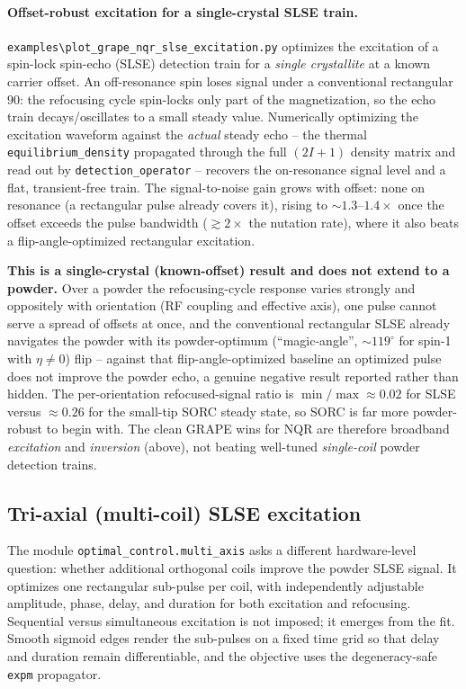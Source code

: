 \documentclass[11pt,oneside]{report}
\newcommand{\code}[1]{\texttt{#1}}
\begin{document}
\paragraph{Offset-robust excitation for a single-crystal SLSE train.}
\code{examples\textbackslash plot\_grape\_nqr\_slse\_excitation.py} optimizes the
excitation of a spin-lock spin-echo (SLSE) detection train for a \emph{single
crystallite} at a known carrier offset. An off-resonance spin loses signal under
a conventional rectangular \(90\): the refocusing cycle spin-locks only part of
the magnetization, so the echo train decays/oscillates to a small steady value.
Numerically optimizing the excitation waveform against the \emph{actual} steady
echo -- the thermal \code{equilibrium\_density} propagated through the full
\((2I+1)\) density matrix and read out by \code{detection\_operator} -- recovers
the on-resonance signal level and a flat, transient-free train. The
signal-to-noise gain grows with offset: none on resonance (a rectangular pulse
already covers it), rising to \(\sim 1.3\text{--}1.4\times\) once the offset
exceeds the pulse bandwidth (\(\gtrsim 2\times\) the nutation rate), where it also
beats a flip-angle-optimized rectangular excitation.

\textbf{This is a single-crystal (known-offset) result and does not extend to a
powder.} Over a powder the refocusing-cycle response varies strongly and
oppositely with orientation (RF coupling and effective axis), one pulse cannot
serve a spread of offsets at once, and the conventional rectangular SLSE already
navigates the powder with its powder-optimum (``magic-angle'', \(\sim 119^\circ\)
for spin-1 with \(\eta\neq 0\)) flip -- against that flip-angle-optimized
baseline an optimized pulse does not improve the powder echo, a genuine negative
result reported rather than hidden. The per-orientation refocused-signal ratio is
\(\min/\max\approx 0.02\) for SLSE versus \(\approx 0.26\) for the small-tip SORC
steady state, so SORC is far more powder-robust to begin with. The clean GRAPE
wins for NQR are therefore broadband \emph{excitation} and \emph{inversion}
(above), not beating well-tuned \emph{single-coil} powder detection trains.

\subsection{Tri-axial (multi-coil) SLSE excitation}
\label{sec:grape-multi-axis}

The module \code{optimal\_control.multi\_axis} asks a different hardware-level
question: whether additional orthogonal coils improve the powder SLSE signal.
It optimizes one rectangular sub-pulse per coil, with independently adjustable
amplitude, phase, delay, and duration for both excitation and refocusing.
Sequential versus simultaneous excitation is not imposed; it emerges from the
fit. Smooth sigmoid edges render the sub-pulses on a fixed time grid so that
delay and duration remain differentiable, and the objective uses the
degeneracy-safe \code{expm} propagator.
\end{document}
